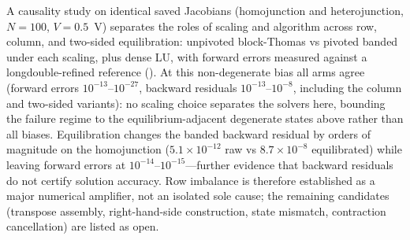 A causality study on identical saved Jacobians (homojunction
and heterojunction, $N=100$, $V=0.5$~V) separates the roles of scaling
and algorithm across row, column, and two-sided equilibration:
unpivoted block-Thomas vs pivoted banded under each scaling, plus dense
LU, with forward errors measured against a longdouble-refined reference
(). At this
non-degenerate bias all arms agree (forward errors $10^{-13}$--$10^{-27}$,
backward residuals $10^{-13}$--$10^{-8}$, including the column and
two-sided variants): no scaling choice separates the solvers here,
bounding the failure regime to the equilibrium-adjacent degenerate
states above rather than all biases. Equilibration changes the banded
backward residual by orders of magnitude on the homojunction
($5.1\times10^{-12}$ raw vs $8.7\times10^{-8}$ equilibrated) while
leaving forward errors at $10^{-14}$--$10^{-15}$---further evidence
that backward residuals do not certify solution accuracy. Row imbalance
is therefore established as a major numerical amplifier, not an
isolated sole cause; the remaining candidates (transpose assembly,
right-hand-side construction, state mismatch, contraction cancellation)
are listed as open.

